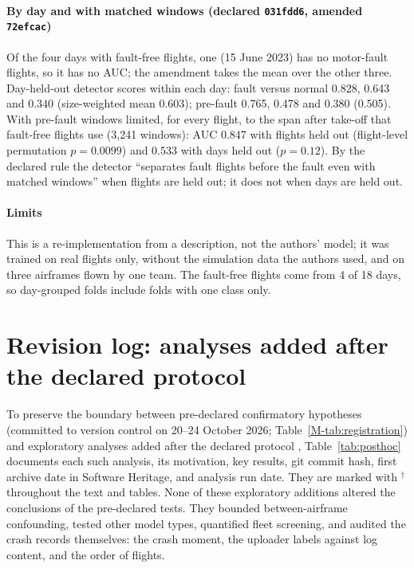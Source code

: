 \documentclass[preprint,12pt]{elsarticle}
\begin{document}
\paragraph{By day and with matched windows (declared \texttt{031fdd6}, amended \texttt{72efcac})} Of the four days with fault-free flights, one (15 June 2023) has no motor-fault flights, so it has no AUC; the amendment takes the mean over the other three. Day-held-out detector scores within each day: fault versus normal 0.828, 0.643 and 0.340 (size-weighted mean 0.603); pre-fault 0.765, 0.478 and 0.380 (0.505). With pre-fault windows limited, for every flight, to the span after take-off that fault-free flights use (3,241 windows): AUC 0.847 with flights held out (flight-level permutation $p=0.0099$) and 0.533 with days held out ($p=0.12$). By the declared rule the detector ``separates fault flights before the fault even with matched windows'' when flights are held out; it does not when days are held out.

\paragraph{Limits} This is a re-implementation from a description, not the authors' model; it was trained on real flights only, without the simulation data the authors used, and on three airframes flown by one team. The fault-free flights come from 4 of 18 days, so day-grouped folds include folds with one class only.
\FloatBarrier

\section{Revision log: analyses added after the declared protocol}
\label{sec:posthoc}

\label{sec:posthoc}
To preserve the boundary between pre-declared confirmatory hypotheses (committed to version control on 20--24 October 2026; Table~\ref{M-tab:registration}) and exploratory analyses added after the declared protocol \cite{nosek2018prereg}, Table~\ref{tab:posthoc} documents each such analysis, its motivation, key results, git commit hash, first archive date in Software Heritage, and analysis run date. They are marked with $^\dagger$ throughout the text and tables. None of these exploratory additions altered the conclusions of the pre-declared tests. They bounded between-airframe confounding, tested other model types, quantified fleet screening, and audited the crash records themselves: the crash moment, the uploader labels against log content, and the order of flights.
\end{document}
